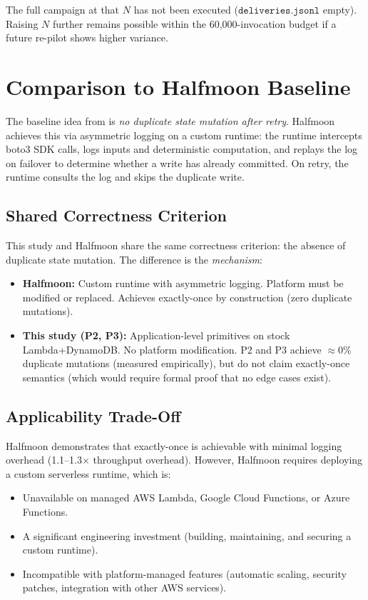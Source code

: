 The full campaign at that $N$ has not been executed ($\texttt{deliveries.jsonl}$ empty). Raising $N$ further remains possible within the 60{,}000-invocation budget if a future re-pilot shows higher variance.

\section{Comparison to Halfmoon Baseline}

The baseline idea from \citet{Qi2025Halfmoon} is \textit{no duplicate state mutation after retry}. Halfmoon achieves this via asymmetric logging on a custom runtime: the runtime intercepts boto3 SDK calls, logs inputs and deterministic computation, and replays the log on failover to determine whether a write has already committed. On retry, the runtime consults the log and skips the duplicate write.

\subsection{Shared Correctness Criterion}

This study and Halfmoon share the same correctness criterion: the absence of duplicate state mutation. The difference is the \textit{mechanism}:

\begin{itemize}
    \item \textbf{Halfmoon:} Custom runtime with asymmetric logging. Platform must be modified or replaced. Achieves exactly-once by construction (zero duplicate mutations).
    \item \textbf{This study (P2, P3):} Application-level primitives on stock Lambda+DynamoDB. No platform modification. P2 and P3 achieve $\approx 0\%$ duplicate mutations (measured empirically), but do not claim exactly-once semantics (which would require formal proof that no edge cases exist).
\end{itemize}

\subsection{Applicability Trade-Off}

Halfmoon demonstrates that exactly-once is achievable with minimal logging overhead (1.1--1.3$\times$ throughput overhead). However, Halfmoon requires deploying a custom serverless runtime, which is:

\begin{itemize}
    \item Unavailable on managed AWS Lambda, Google Cloud Functions, or Azure Functions.
    \item A significant engineering investment (building, maintaining, and securing a custom runtime).
    \item Incompatible with platform-managed features (automatic scaling, security patches, integration with other AWS services).
\end{itemize}

